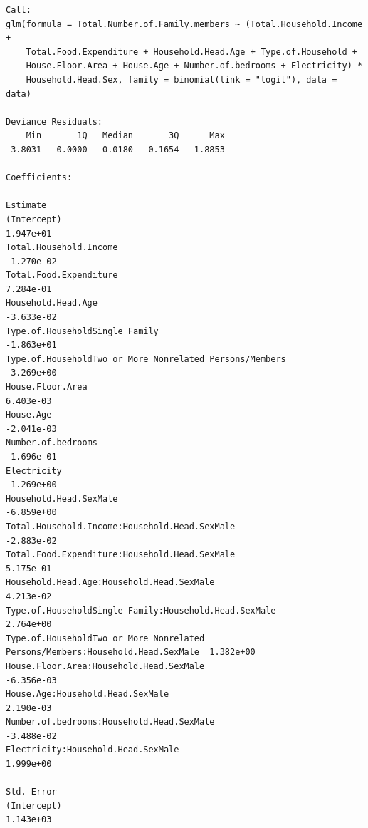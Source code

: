 \documentclass[
]{article}
\begin{document}
\begin{verbatim}
Call:
glm(formula = Total.Number.of.Family.members ~ (Total.Household.Income + 
    Total.Food.Expenditure + Household.Head.Age + Type.of.Household + 
    House.Floor.Area + House.Age + Number.of.bedrooms + Electricity) * 
    Household.Head.Sex, family = binomial(link = "logit"), data = data)

Deviance Residuals: 
    Min       1Q   Median       3Q      Max  
-3.8031   0.0000   0.0180   0.1654   1.8853  

Coefficients:
                                                                                 Estimate
(Intercept)                                                                     1.947e+01
Total.Household.Income                                                         -1.270e-02
Total.Food.Expenditure                                                          7.284e-01
Household.Head.Age                                                             -3.633e-02
Type.of.HouseholdSingle Family                                                 -1.863e+01
Type.of.HouseholdTwo or More Nonrelated Persons/Members                        -3.269e+00
House.Floor.Area                                                                6.403e-03
House.Age                                                                      -2.041e-03
Number.of.bedrooms                                                             -1.696e-01
Electricity                                                                    -1.269e+00
Household.Head.SexMale                                                         -6.859e+00
Total.Household.Income:Household.Head.SexMale                                  -2.883e-02
Total.Food.Expenditure:Household.Head.SexMale                                   5.175e-01
Household.Head.Age:Household.Head.SexMale                                       4.213e-02
Type.of.HouseholdSingle Family:Household.Head.SexMale                           2.764e+00
Type.of.HouseholdTwo or More Nonrelated Persons/Members:Household.Head.SexMale  1.382e+00
House.Floor.Area:Household.Head.SexMale                                        -6.356e-03
House.Age:Household.Head.SexMale                                                2.190e-03
Number.of.bedrooms:Household.Head.SexMale                                      -3.488e-02
Electricity:Household.Head.SexMale                                              1.999e+00
                                                                               Std. Error
(Intercept)                                                                     1.143e+03

\end{verbatim}
\end{document}
